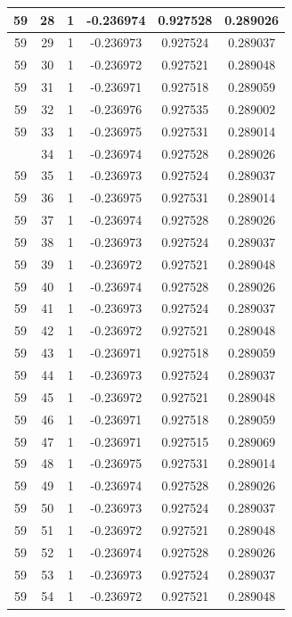 \documentclass[12pt,a4paper]{article}
\numberwithin{equation}{section}
\numberwithin{figure}{section}
\numberwithin{table}{section}
\begin{document}
\begin{longtable}{|c|c|c|c|c|c|}
59 & 28 & 1 & -0.236974 & 0.927528 & 0.289026 \\ \hline
59 & 29 & 1 & -0.236973 & 0.927524 & 0.289037 \\ \hline
59 & 30 & 1 & -0.236972 & 0.927521 & 0.289048 \\ \hline
59 & 31 & 1 & -0.236971 & 0.927518 & 0.289059 \\ \hline
59 & 32 & 1 & -0.236976 & 0.927535 & 0.289002 \\ \hline
59 & 33 & 1 & -0.236975 & 0.927531 & 0.289014 \\ \hline
\pagebreak
59 & 34 & 1 & -0.236974 & 0.927528 & 0.289026 \\ \hline
59 & 35 & 1 & -0.236973 & 0.927524 & 0.289037 \\ \hline
59 & 36 & 1 & -0.236975 & 0.927531 & 0.289014 \\ \hline
59 & 37 & 1 & -0.236974 & 0.927528 & 0.289026 \\ \hline
59 & 38 & 1 & -0.236973 & 0.927524 & 0.289037 \\ \hline
59 & 39 & 1 & -0.236972 & 0.927521 & 0.289048 \\ \hline
59 & 40 & 1 & -0.236974 & 0.927528 & 0.289026 \\ \hline
59 & 41 & 1 & -0.236973 & 0.927524 & 0.289037 \\ \hline
59 & 42 & 1 & -0.236972 & 0.927521 & 0.289048 \\ \hline
59 & 43 & 1 & -0.236971 & 0.927518 & 0.289059 \\ \hline
59 & 44 & 1 & -0.236973 & 0.927524 & 0.289037 \\ \hline
59 & 45 & 1 & -0.236972 & 0.927521 & 0.289048 \\ \hline
59 & 46 & 1 & -0.236971 & 0.927518 & 0.289059 \\ \hline
59 & 47 & 1 & -0.236971 & 0.927515 & 0.289069 \\ \hline
59 & 48 & 1 & -0.236975 & 0.927531 & 0.289014 \\ \hline
59 & 49 & 1 & -0.236974 & 0.927528 & 0.289026 \\ \hline
59 & 50 & 1 & -0.236973 & 0.927524 & 0.289037 \\ \hline
59 & 51 & 1 & -0.236972 & 0.927521 & 0.289048 \\ \hline
59 & 52 & 1 & -0.236974 & 0.927528 & 0.289026 \\ \hline
59 & 53 & 1 & -0.236973 & 0.927524 & 0.289037 \\ \hline
59 & 54 & 1 & -0.236972 & 0.927521 & 0.289048 \\ \hline

\end{longtable}
\end{document}
